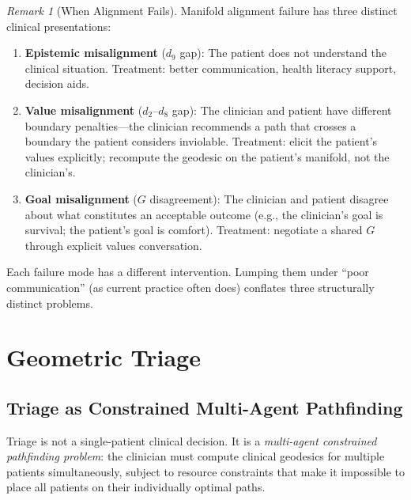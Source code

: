 \documentclass[12pt]{article}
\theoremstyle{definition}
\theoremstyle{remark}
\newtheorem{remark}[theorem]{Remark}
\begin{document}
\begin{remark}[When Alignment Fails]
Manifold alignment failure has three distinct clinical presentations:
\begin{enumerate}
    \item \textbf{Epistemic misalignment} ($d_9$ gap): The patient does not understand the clinical situation.  Treatment: better communication, health literacy support, decision aids.
    \item \textbf{Value misalignment} ($d_2$--$d_8$ gap): The clinician and patient have different boundary penalties---the clinician recommends a path that crosses a boundary the patient considers inviolable.  Treatment: elicit the patient's values explicitly; recompute the geodesic on the patient's manifold, not the clinician's.
    \item \textbf{Goal misalignment} ($G$ disagreement): The clinician and patient disagree about what constitutes an acceptable outcome (e.g., the clinician's goal is survival; the patient's goal is comfort).  Treatment: negotiate a shared $G$ through explicit values conversation.
\end{enumerate}
Each failure mode has a different intervention.  Lumping them under ``poor communication'' (as current practice often does) conflates three structurally distinct problems.
\end{remark}


\section{Geometric Triage}
\label{sec:triage}

\subsection{Triage as Constrained Multi-Agent Pathfinding}

Triage is not a single-patient clinical decision.  It is a \emph{multi-agent constrained pathfinding problem}: the clinician must compute clinical geodesics for multiple patients simultaneously, subject to resource constraints that make it impossible to place all patients on their individually optimal paths.
\end{document}

